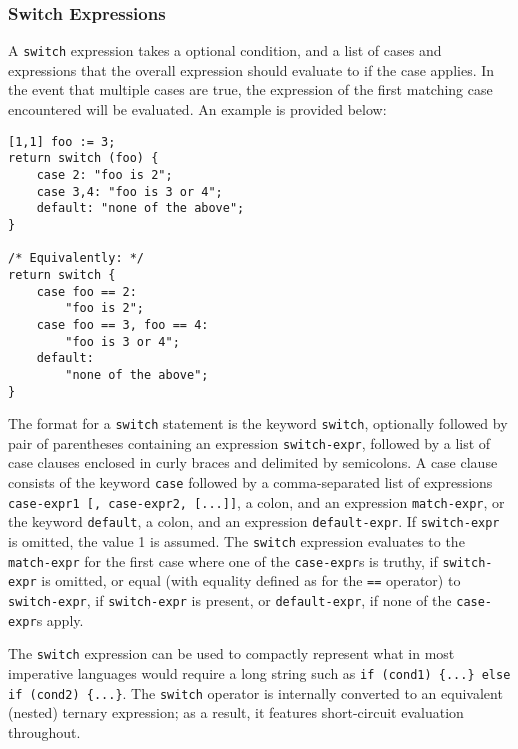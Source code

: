 \subsubsection{Switch Expressions}
\label{sec:Switch}
A \texttt{switch} expression takes a optional condition, and a list of cases and expressions that the overall expression should evaluate to if the case applies. In the event that multiple cases are true, the expression of the first matching case encountered will be evaluated. An example is provided below:
\begin{lstlisting}
[1,1] foo := 3;
return switch (foo) {
	case 2: "foo is 2";
	case 3,4: "foo is 3 or 4";
	default: "none of the above";
}

/* Equivalently: */
return switch {
	case foo == 2:
		"foo is 2";
	case foo == 3, foo == 4:
		"foo is 3 or 4";
	default:
		"none of the above";
}
\end{lstlisting}
The format for a \texttt{switch} statement is the keyword \texttt{switch}, optionally followed by pair of parentheses containing an expression \texttt{switch-expr}, followed by a list of case clauses enclosed in curly braces and delimited by semicolons. A case clause consists of the keyword \texttt{case} followed by a comma-separated list of expressions \texttt{case-expr1 [, case-expr2, [...]]}, a colon, and an expression \texttt{match-expr}, or the keyword \texttt{default}, a colon, and an expression \texttt{default-expr}. If \texttt{switch-expr} is omitted, the value 1 is assumed. The \texttt{switch} expression evaluates to the \texttt{match-expr} for the first case where one of the \texttt{case-expr}s is truthy, if \texttt{switch-expr} is omitted, or equal (with equality defined as for the \texttt{==} operator) to \texttt{switch-expr}, if \texttt{switch-expr} is present, or \texttt{default-expr}, if none of the \texttt{case-expr}s apply.

The \texttt{switch} expression can be used to compactly represent what in most imperative languages would require a long string such as \texttt{if (cond1) \{...\} else if (cond2) \{...\}}. The \texttt{switch} operator is internally converted to an equivalent (nested) ternary expression; as a result, it features short-circuit evaluation throughout.


